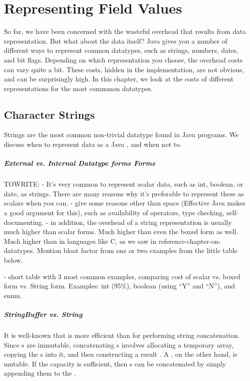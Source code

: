 \chapter{Representing Field Values}

So far, we have been concerned with the wasteful overhead that results from
data representation. But what about the data itself?
Java gives you a number of different ways to represent common datatypes, such
as strings, numbers, dates, and bit flags. Depending on which
representation you choose, the overhead costs can vary quite a bit. 
These costs, hidden in the implementation, are not obvious, and can be
surprisingly high.
In this chapter, we look at the costs of different representations for the most 
commmon datatypes.

\section{Character Strings}
Strings are the most common non-trivial datatype found in Java programs. We
discuss when to represent data as a Java , and when not to.
\paragraph{External vs. Internal Datatype forms Forms}
TOWRITE:
- It's very common to represent scalar data, such as int, boolean, or date, as
strings. There are many reasons why it's preferable to represent these as
scalars when you can. - give some reasons other than space (Effective Java makes
a good argument for this), such as availability of operators, type checking, self-documenting.  - in
addition, the overhead of a string representation is usually much higher than scalar forms. 
Much higher than even the boxed form as well.  Much higher
than in languages like C, as we saw in reference-chapter-on-datatypes.  Mention
bloat factor from one or two examples from the little table below.

- short table with 3 most common examples, comparing cost of scalar
vs. boxed form vs. String form.  Examples: int (95\%), boolean (using ``Y''
and ``N''), and enum. 

\paragraph{StringBuffer vs. String}

It is well-known that  is more efficient than
 for performing string concatenation. Since s are
immutable, concatenating s involves allocating a temporary
 array, copying the s into it, and then constructing
a result . A , on the other hand, is mutable.
If the  capacity is sufficient, then s
can be concatenated by simply appending them to the .

